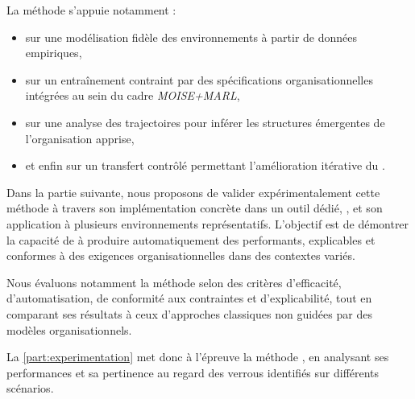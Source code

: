 \medskip

\noindent
La méthode s'appuie notamment :
\begin{itemize}
    \item sur une modélisation fidèle des environnements à partir de données empiriques,
    \item sur un entraînement contraint par des spécifications organisationnelles intégrées au sein du cadre \textit{MOISE+MARL},
    \item sur une analyse des trajectoires pour inférer les structures émergentes de l'organisation apprise,
    \item et enfin sur un transfert contrôlé permettant l'amélioration itérative du .
\end{itemize}

\noindent
Dans la partie suivante, nous proposons de valider expérimentalement cette méthode à travers son implémentation concrète dans un outil dédié, , et son application à plusieurs environnements représentatifs. L'objectif est de démontrer la capacité de  à produire automatiquement des  performants, explicables et conformes à des exigences organisationnelles dans des contextes variés.

\medskip

\noindent
Nous évaluons notamment la méthode selon des critères d'efficacité, d'automatisation, de conformité aux contraintes et d'explicabilité, tout en comparant ses résultats à ceux d'approches classiques non guidées par des modèles organisationnels.

\bigskip

La \autoref{part:experimentation} met donc à l'épreuve la méthode , en analysant ses performances et sa pertinence au regard des verrous identifiés sur différents scénarios.
